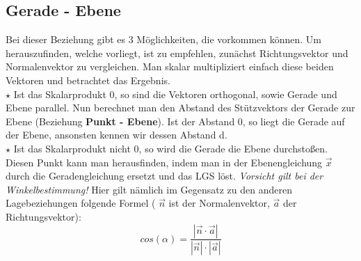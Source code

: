\subsection{Gerade - Ebene}
Bei dieser Beziehung gibt es 3 Möglichkeiten, die vorkommen können. Um herauszufinden, welche vorliegt, ist zu empfehlen, zunächst Richtungsvektor und Normalenvektor zu vergleichen. Man skalar multipliziert einfach diese beiden Vektoren und betrachtet das Ergebnis.\\
\(\star\) Ist das Skalarprodukt 0, so sind die Vektoren orthogonal, sowie Gerade und Ebene parallel. Nun berechnet man den Abstand des Stützvektors der Gerade zur Ebene (Beziehung \textbf{Punkt - Ebene}). Ist der Abstand 0, so liegt die Gerade auf der Ebene, ansonsten kennen wir dessen Abstand d.\\
\(\star\) Ist das Skalarprodukt nicht 0, so wird die Gerade die Ebene durchstoßen. Diesen Punkt kann man herausfinden, indem man in der Ebenengleichung \(\vec{x}\) durch die Geradengleichung ersetzt und das LGS löst.
\emph{Vorsicht gilt bei der Winkelbestimmung!} Hier gilt nämlich im Gegensatz zu den anderen Lagebeziehungen folgende Formel ( \(\vec{n}\) ist der Normalenvektor, \(\vec{a}\) der Richtungsvektor):
\[cos(\alpha)=\frac{|\vec{n}\cdot \vec{a}|}{|\vec{n}|\cdot |\vec{a}|}\]
